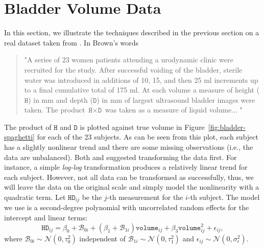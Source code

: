 \documentclass[useAMS,usenatbib,usegraphicx,referee]{biom}\usepackage[]{graphicx}\usepackage[]{color}
\newcommand{\code}[1]{\texttt{#1}}
\begin{document}
\section{Bladder Volume Data}
\label{sec:bladder}
In this section, we illustrate the techniques described in the previous section on a real dataset taken from \citet{brown_measurement_1993}. In Brown's words
\begin{quotation}
\noindent"A series of 23 women patients attending a urodynamic clinic were recruited for the study. After successful voiding of the bladder, sterile water was introduced in additions of 10, 15, and then 25 ml increments up to a final cumulative total of 175 ml. At each volume a measure of height ($\texttt{H}$) in mm and depth ($\texttt{D}$) in mm of largest ultrasound bladder images were taken. The product $\texttt{H} \times \texttt{D}$ was taken as a measure of liquid volume...
"\end{quotation}
The product of $\code{H}$ and $\code{D}$ is plotted against true volume in Figure~\ref{fig:bladder-spaghetti} for each of the 23 subjects. As can be seen from this plot, each subject has a slightly nonlinear trend and there are some missing observations (i.e., the data are unbalanced). Both \citet{brown_measurement_1993} and \citet{oman_calibration_1998} suggested transforming the data first. For instance, a simple \textit{log-log} transformation produces a relatively linear trend for each subject. However, not all data can be transformed as successfully, thus, we will leave the data on the original scale and simply model the nonlinearity with a quadratic term. Let $\code{HD}_{ij}$ be the $j$-th measurement for the $i$-th subject. The model we use is a second-degree polynomial with uncorrelated random effects for the intercept and linear terms:
\[
  \code{HD}_{ij} = \beta_0+\mathscr{B}_{0i} + \left(\beta_1+\mathscr{B}_{1i}\right)\code{volume}_{ij} + \beta_3\code{volume}_{ij}^2 + \epsilon_{ij},
\]
where $\mathscr{B}_{0i} \sim \mathcal{N}\left(0, \tau_0^2\right)$ independent of $\mathscr{B}_{1i} \sim \mathcal{N}\left(0, \tau_1^2\right)$ and $\epsilon_{ij} \sim \mathcal{N}\left(0, \sigma_\epsilon^2\right)$.
\end{document}
